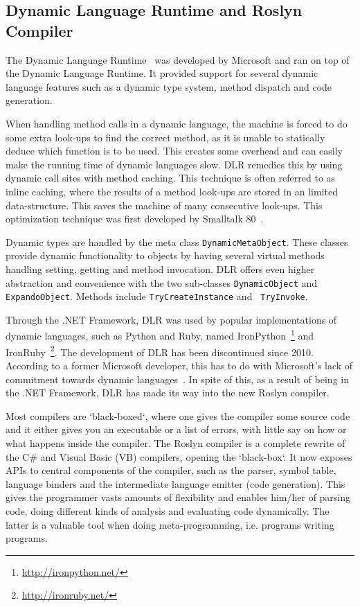 
\subsection{Dynamic Language Runtime and Roslyn Compiler}

The Dynamic Language Runtime~\cite{dlr} was developed by Microsoft and ran on
top of the Dynamic Language Runtime. It provided support for several dynamic
language features such as a dynamic type system, method dispatch and code
generation.

When handling method calls in a dynamic language, the machine is forced to do
some extra look-ups to find the correct method, as it is unable to statically
deduce which function is to be used. This creates some overhead and can easily
make the running time of dynamic languages slow. DLR remedies this by using
dynamic call sites with method caching. This technique is often referred to as
inline caching, where the results of a method look-ups are stored in an limited
data-structure. This saves the machine of many consecutive look-ups. This
optimization technique was first developed by Smalltalk 80~\cite{deutsch}.

Dynamic types are handled by the meta class {\tt DynamicMetaObject}. These
classes provide dynamic functionality to objects by having several virtual
methods handling setting, getting and method invocation. DLR offers even higher
abstraction and convenience with the two sub-classes {\tt DynamicObject} and
{\tt ExpandoObject}. Methods include {\tt TryCreateInstance} and {\tt
  TryInvoke}.

Through the .NET Framework, DLR was used by popular implementations of dynamic
languages, such as Python and Ruby, named
IronPython~\footnote{\url{http://ironpython.net/}} and
IronRuby~\footnote{\url{http://ironruby.net/}}. The development of DLR has been
discontinued since 2010. According to a former Microsoft developer, this has to
do with Microsoft's lack of commitment towards dynamic
languages~\cite{schementi}\cite{cooper}. In spite of this, as a result of being
in the .NET Framework, DLR has made its way into the new Roslyn compiler.

Most compilers are `black-boxed`, where one gives the compiler some source code
and it either gives you an executable or a list of errors, with little say on
how or what happens inside the compiler. The Roslyn compiler is a complete
rewrite of the C\# and Visual Basic (VB) compilers, opening the `black-box`. It
now exposes APIs to central components of the compiler, such as the parser,
symbol table, language binders and the intermediate language emitter (code
generation). This gives the programmer vasts amounts of flexibility and enables
him/her of parsing code, doing different kinds of analysis and evaluating code
dynamically. The latter is a valuable tool when doing meta-programming,
i.e. programs writing programs.
